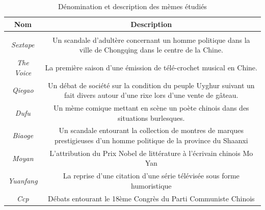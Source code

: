 \begin{table}[h!]
  \begin{tabulary}{\textwidth}{c|C}

    \textbf{Nom} &
    \textbf{Description}\\
    \hline \\[-1.5ex]
    \textit{Sextape} &
    Un scandale d{\textquoteright}adultère concernant un homme politique
    dans la ville de Chongqing dans le centre de la Chine.\\[2ex]

    \textit{The Voice} &
    La première saison d{\textquoteright}une émission de
    télé-crochet musical en Chine.\\[2ex]

    \textit{Qiegao} &
    Un débat de société sur la condition du peuple Uyghur suivant un
    fait divers autour d{\textquoteright}une rixe lors
    d{\textquoteright}une vente de gâteau.\\[2ex]

    \textit{Dufu} &
    Un mème comique mettant en scène un poète chinois dans des
    situations burlesques.\\[2ex]

    \textit{Biaoge} &
    Un scandale entourant la collection de montres de marques prestigieuses
    d{\textquoteright}un homme politique de la province du Shaanxi \\[2ex]

    \textit{Moyan} &
    L{\textquoteright}attribution du Prix Nobel de littérature \`a
    l{\textquoteright}écrivain chinois Mo Yan\\[2ex]

    \textit{Yuanfang} &
    La reprise d{\textquoteright}une citation d{\textquoteright}une série
    télévisée sous forme humoristique\\[2ex]

    \textit{Ccp} &
    Débats entourant le 18ème Congrès du Parti Communiste Chinois\\[2ex]

  \end{tabulary}
  \caption{Dénomination et description des mèmes étudiés}
  \label{fig:meme-sample}
\end{table}

